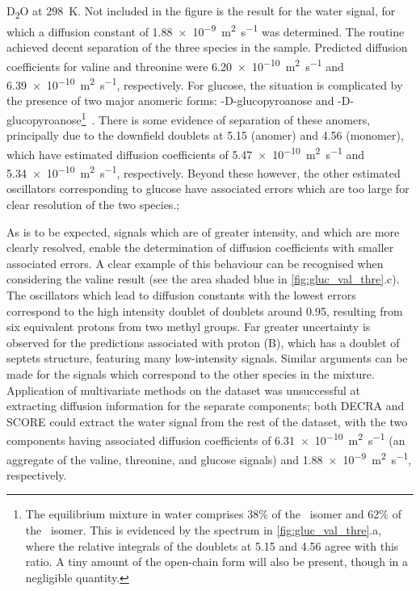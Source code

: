D\textsubscript{2}O at \qty{298}{\kelvin}. Not included in the figure is the
result for the water signal, for which a diffusion constant of
\qty{1.88e-9}{\meter\squared\per\second} was determined. The routine
achieved decent separation of the three species in the sample. Predicted
diffusion coefficients for valine and threonine were
\qty{6.20e-10}{\meter\squared\per\second} and
\qty{6.39e-10}{\meter\squared\per\second}, respectively. For glucose, the situation is
complicated by the presence of two major anomeric forms:
\textalpha-D-glucopyroanose and
\textbeta-D-glucopyroanose\footnote{
    The equilibrium mixture in water comprises 38\% of the \textalpha\ isomer
    and 62\% of the \textbeta\ isomer.
    This is evidenced by the
    spectrum in \cref{fig:gluc_val_thre}.a, where the relative integrals of
    the doublets at \qty{5.15}{\partspermillion} and
    \qty{4.56}{\partspermillion} agree with this ratio.
    A tiny amount of the open-chain form will
    also be present, though in a negligible quantity.
}~\cite[Chapter 3]{Davis2002}.
There is some evidence of separation of these anomers, principally due
to the downfield doublets at \qty{5.15}{\partspermillion} (\textalpha anomer) and
\qty{4.56}{\partspermillion} (\textbeta monomer), which have estimated diffusion
coefficients of \qty{5.47e-10}{\meter\squared\per\second}
and \qty{5.34e-10}{\meter\squared\per\second}, respectively. Beyond these
however, the other estimated oscillators corresponding to glucose have
associated errors which are too large for clear resolution of the two species.;

As is to be expected, signals which are of greater intensity, and which are
more clearly resolved, enable the determination of diffusion coefficients with
smaller associated errors. A clear example of this behaviour can be recognised when
considering the valine result (see the area shaded blue in
\cref{fig:gluc_val_thre}.c). The
oscillators which lead to diffusion constants with the lowest errors correspond to
the high intensity doublet of doublets around \qty{0.95}{\partspermillion},
resulting from six equivalent protons from two methyl groups. Far
greater uncertainty is observed for the predictions associated with proton (B),
which has a doublet of septets structure, featuring many low-intensity signals.
Similar arguments can be made for the signals which correspond to the other
species in the mixture.
Application of multivariate methods on the dataset was unsuccessful at
extracting diffusion information for the separate components; both
\ac{DECRA} and \ac{SCORE} could extract the water
signal from the rest of the dataset, with the two components having associated
diffusion coefficients of \qty{6.31e-10}{\meter\squared\per\second} (an
aggregate of the valine, threonine, and glucose signals) and
\qty{1.88e-9}{\meter\squared\per\second}, respectively.
